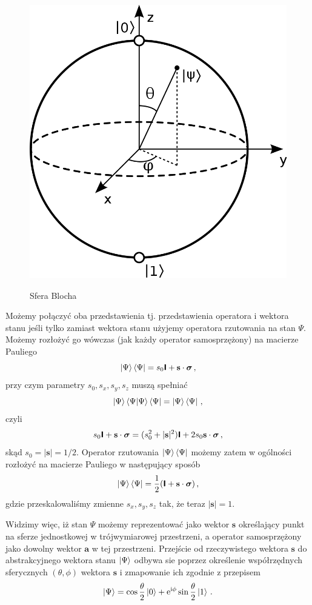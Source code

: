 \documentclass{myclass}
\begin{document}
\begin{figure}[ht]
    \centering
    \includegraphics[width=0.45\columnwidth]{figs/Bloch_sphere.png}
    \label{fig:bloch_sphere}
    \caption{Sfera Blocha}
\end{figure}

Możemy połączyć oba przedstawienia tj. przedstawienia operatora i wektora stanu jeśli tylko zamiast
wektora stanu użyjemy operatora rzutowania na stan \(\Psi\). Możemy rozłożyć go wówczas (jak każdy
operator samosprzężony) na macierze Pauliego
\begin{equation*}
    \ket{\Psi}\bra{\Psi} = s_0\boldsymbol{\mathsf{I}} + \mathbf{s}\cdot\boldsymbol{\sigma}\,,
\end{equation*}
przy czym parametry \(s_0,s_x,s_y,s_z\) muszą spełniać
\begin{equation*}
    \ket{\Psi}\bra{\Psi}\ket{\Psi}\bra{\Psi} = \ket{\Psi}\bra{\Psi}\,,
\end{equation*}
czyli
\begin{equation*}
    s_0\boldsymbol{\mathsf{I}} + \mathbf{s}\cdot\boldsymbol{\sigma} = (s_0^2 + |\mathbf{s}|^2)\boldsymbol{\mathsf{I}} + 2s_0\mathbf{s}\cdot\boldsymbol{\sigma}\,,
\end{equation*}
skąd \(s_0 = |\mathbf{s}| = 1/2\). Operator rzutowania \(\ket{\Psi}\bra{\Psi}\) możemy zatem w
ogólności rozłożyć na macierze Pauliego w następujący sposób
\begin{equation*}
    \ket{\Psi}\bra{\Psi} = \frac{1}{2}(\boldsymbol{\mathsf{I}} + \mathbf{s}\cdot\boldsymbol{\sigma})\,,
\end{equation*}
gdzie przeskalowaliśmy zmienne \(s_x,s_y,s_z\) tak, że teraz \(\boxed{|\mathbf{s}| = 1}\).

Widzimy więc, iż stan \(\Psi\) możemy reprezentować jako wektor \(\mathbf{s}\) określający punkt na
sferze jednostkowej w trójwymiarowej przestrzeni, a operator samosprzężony jako dowolny wektor
\(\mathbf{a}\) w tej przestrzeni. Przejście od rzeczywistego wektora \(\mathbf{s}\) do
abstrakcyjnego wektora stanu \(\ket{\Psi}\) odbywa sie poprzez określenie współrzędnych sferycznych
\((\theta,\phi)\) wektora \(\mathbf{s}\) i zmapowanie ich zgodnie z przepisem
\begin{equation*}
    \ket{\Psi} = \cos\frac{\theta}{2}\ket{0} + \mathrm{e}^{\mathrm{i}\phi}\sin\frac{\theta}{2}\ket{1}\,.
\end{equation*}
\end{document}
